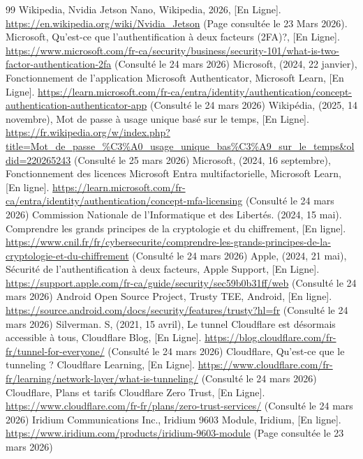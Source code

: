 \begin{thebibliographyUL}{99}
     Wikipedia, Nvidia Jetson Nano, Wikipedia, 2026, [En Ligne]. \url{https://en.wikipedia.org/wiki/Nvidia_Jetson} (Page consultée le 23 Mars 2026).
     Microsoft, Qu’est-ce que l’authentification à deux facteurs (2FA)?, [En Ligne]. \url{https://www.microsoft.com/fr-ca/security/business/security-101/what-is-two-factor-authentication-2fa} (Consulté le 24 mars 2026)
     Microsoft, (2024, 22 janvier), Fonctionnement de l’application Microsoft Authenticator, Microsoft Learn, [En Ligne]. \url{https://learn.microsoft.com/fr-ca/entra/identity/authentication/concept-authentication-authenticator-app} (Consulté le 24 mars 2026)
     Wikipédia, (2025, 14 novembre), Mot de passe à usage unique basé sur le temps, [En Ligne]. \url{https://fr.wikipedia.org/w/index.php?title=Mot_de_passe_%C3%A0_usage_unique_bas%C3%A9_sur_le_temps&oldid=220265243} (Consulté le 25 mars 2026)
     Microsoft, (2024, 16 septembre), Fonctionnement des licences Microsoft Entra multifactorielle, Microsoft Learn, [En ligne]. \url{https://learn.microsoft.com/fr-ca/entra/identity/authentication/concept-mfa-licensing} (Consulté le 24 mars 2026)
     Commission Nationale de l'Informatique et des Libertés. (2024, 15 mai). Comprendre les grands principes de la cryptologie et du chiffrement, [En ligne]. \url{https://www.cnil.fr/fr/cybersecurite/comprendre-les-grands-principes-de-la-cryptologie-et-du-chiffrement} (Consulté le 24 mars 2026)
     Apple, (2024, 21 mai), Sécurité de l’authentification à deux facteurs, Apple Support, [En Ligne]. \url{https://support.apple.com/fr-ca/guide/security/sec59b0b31ff/web} (Consulté le 24 mars 2026)
    Android Open Source Project, Trusty TEE, Android, [En ligne]. \url{https://source.android.com/docs/security/features/trusty?hl=fr} (Consulté le 24 mars 2026)
     Silverman. S, (2021, 15 avril), Le tunnel Cloudflare est désormais accessible à tous, Cloudflare Blog, [En Ligne]. \url{https://blog.cloudflare.com/fr-fr/tunnel-for-everyone/} (Consulté le 24 mars 2026)
     Cloudflare, Qu’est-ce que le tunneling ? Cloudflare Learning, [En Ligne]. \url{https://www.cloudflare.com/fr-fr/learning/network-layer/what-is-tunneling/} (Consulté le 24 mars 2026)
     Cloudflare, Plans et tarifs Cloudflare Zero Trust, [En Ligne]. \url{https://www.cloudflare.com/fr-fr/plans/zero-trust-services/} (Consulté le 24 mars 2026)
     Iridium Communications Inc., Iridium 9603 Module, Iridium, [En ligne]. \url{https://www.iridium.com/products/iridium-9603-module} (Page consultée le 23 mars 2026)

\end{thebibliographyUL}
